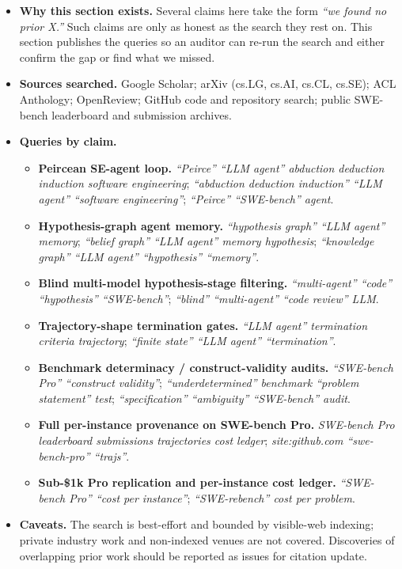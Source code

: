 \documentclass[
  10pt,
]{article}
\providecommand{\tightlist}{%
  \setlength{\itemsep}{0pt}\setlength{\parskip}{0pt}}
\begin{document}
\begin{itemize}
\tightlist
\item
  \textbf{Why this section exists.} Several claims here take the form
  \emph{``we found no prior X.''} Such claims are only as honest as the
  search they rest on. This section publishes the queries so an auditor
  can re-run the search and either confirm the gap or find what we
  missed.
\item
  \textbf{Sources searched.} Google Scholar; arXiv (cs.LG, cs.AI, cs.CL,
  cs.SE); ACL Anthology; OpenReview; GitHub code and repository search;
  public SWE-bench leaderboard and submission archives.
\item
  \textbf{Queries by claim.}

  \begin{itemize}
  \tightlist
  \item
    \textbf{Peircean SE-agent loop.} \emph{``Peirce'' ``LLM agent''
    abduction deduction induction software engineering};
    \emph{``abduction deduction induction'' ``LLM agent'' ``software
    engineering''}; \emph{``Peirce'' ``SWE-bench'' agent}.
  \item
    \textbf{Hypothesis-graph agent memory.} \emph{``hypothesis graph''
    ``LLM agent'' memory}; \emph{``belief graph'' ``LLM agent'' memory
    hypothesis}; \emph{``knowledge graph'' ``LLM agent'' ``hypothesis''
    ``memory''}.
  \item
    \textbf{Blind multi-model hypothesis-stage filtering.}
    \emph{``multi-agent'' ``code'' ``hypothesis'' ``SWE-bench''};
    \emph{``blind'' ``multi-agent'' ``code review'' LLM}.
  \item
    \textbf{Trajectory-shape termination gates.} \emph{``LLM agent''
    termination criteria trajectory}; \emph{``finite state'' ``LLM
    agent'' ``termination''}.
  \item
    \textbf{Benchmark determinacy / construct-validity audits.}
    \emph{``SWE-bench Pro'' ``construct validity''};
    \emph{``underdetermined'' benchmark ``problem statement'' test};
    \emph{``specification'' ``ambiguity'' ``SWE-bench'' audit}.
  \item
    \textbf{Full per-instance provenance on SWE-bench Pro.}
    \emph{SWE-bench Pro leaderboard submissions trajectories cost
    ledger}; \emph{site:github.com ``swe-bench-pro'' ``trajs''}.
  \item
    \textbf{Sub-\$1k Pro replication and per-instance cost ledger.}
    \emph{``SWE-bench Pro'' ``cost per instance''};
    \emph{``SWE-rebench'' cost per problem}.
  \end{itemize}
\item
  \textbf{Caveats.} The search is best-effort and bounded by visible-web
  indexing; private industry work and non-indexed venues are not
  covered. Discoveries of overlapping prior work should be reported as
  issues for citation update.
\end{itemize}
\end{document}
